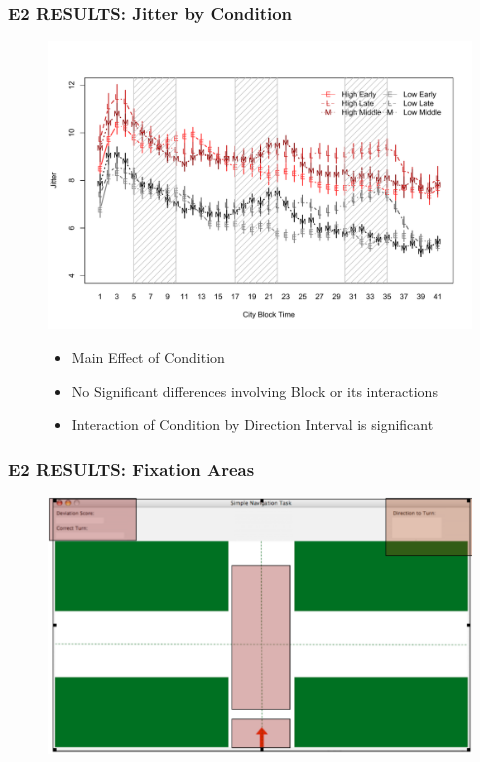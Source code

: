 \documentclass{beamer}
\begin{document}
\begin{frame} %
	\frametitle{E2 RESULTS: Jitter by Condition}
	\vspace{-1cm}
	\begin{figure}
		\centering
		\includegraphics[width=.9\textwidth]{../zNvBkFigs/Rplot-E2-Jit41-noTit}
		{\tiny{\begin{itemize}
			\item Main Effect of Condition
			\item No Significant differences involving Block or its interactions
			\item Interaction of Condition by Direction Interval is significant
		\end{itemize}}}
	\end{figure}
\end{frame}

\begin{frame} 
	\frametitle{E2 RESULTS: Fixation Areas}
	\begin{figure}
		\centering
		\includegraphics[width=.9\textwidth]{../zNvBkFigs/fig-E2-AOI}
	\end{figure}
\end{frame}
\end{document}

